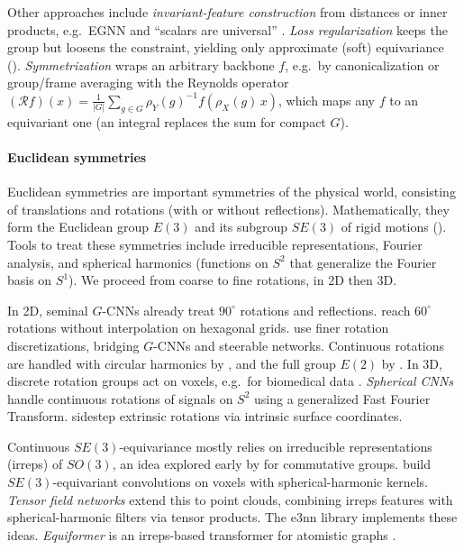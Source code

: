 \documentclass[mathematics,review,submit,moreauthors]{Definitions/mdpi}
\begin{document}
Other approaches include \emph{invariant-feature construction} from distances or inner products, e.g.\ EGNN \citep{satorras2021p3icml} and ``scalars are universal'' \citep{villar2021anips}.
\emph{Loss regularization} keeps the group but loosens the constraint, yielding only approximate (soft) equivariance ().
\emph{Symmetrization} wraps an arbitrary backbone $f$, e.g.\ by canonicalization \citep{kaba2023p4icml} or group/frame averaging \citep{puny2021} with the Reynolds operator $(\mathcal{R}f)(x)=\frac{1}{|G|}\sum_{g\in G}\rho_Y(g)^{-1}f(\rho_X(g)\,x)$, which maps any $f$ to an equivariant one (an integral replaces the sum for compact $G$).

\paragraph{Euclidean symmetries}
Euclidean symmetries are important symmetries of the physical world, consisting of translations and rotations (with or without reflections).
Mathematically, they form the Euclidean group $E(3)$ and its subgroup $SE(3)$ of rigid motions ().
Tools to treat these symmetries include irreducible representations, Fourier analysis, and spherical harmonics (functions on $S^2$ that generalize the Fourier basis on $S^1$).
We proceed from coarse to fine rotations, in 2D then 3D.

In 2D, seminal $G$-CNNs \citep{cohen2016} already treat $90^\circ$ rotations and reflections.
\citet{hoogeboom2018} reach $60^\circ$ rotations without interpolation on hexagonal grids.
\citet{weiler20182iccvpr} use finer rotation discretizations, bridging $G$-CNNs and steerable networks.
Continuous rotations are handled with circular harmonics by \citet{worrall2017}, and the full group $E(2)$ by \citet{weiler2019anips}.
In 3D, discrete rotation groups act on voxels, e.g.\ for biomedical data \citep{worrall2018cv-e21ecmgs82ppv,winkels2019mia}.
\emph{Spherical CNNs} \citep{cohen2018} handle continuous rotations of signals on $S^2$ using a generalized Fast Fourier Transform.
\citet{monti20172iccvprc} sidestep extrinsic rotations via intrinsic surface coordinates.

Continuous $SE(3)$-equivariance mostly relies on irreducible representations (irreps) of $SO(3)$, an idea explored early by \citet{cohen2014} for commutative groups.
\citet{weiler2018anips} build $SE(3)$-equivariant convolutions on voxels with spherical-harmonic kernels.
\emph{Tensor field networks} \citep{thomas2018} extend this to point clouds, combining irreps features with spherical-harmonic filters via tensor products.
The e3nn library \citep{geiger2022} implements these ideas.
\emph{Equiformer} is an irreps-based transformer for atomistic graphs \citep{liao2022,liao2023}.
\end{document}
